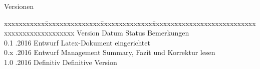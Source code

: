 
\null
\vfill

\begin{Large}
Versionen
\end{Large}

\fontsize{10pt}{18pt}\selectfont
\begin{tabbing}
xxxxxxxxxxx\=xxxxxxxxxxxxxxx\=xxxxxxxxxxxxxx\=xxxxxxxxxxxxxxxxxxxxxxxxxxxxxxxxxxxxxxxxxxxxxxx \kill
Version	\> Datum	\> Status		\> Bemerkungen		\\
0.1	.2016	\> Entwurf		\> Latex-Dokument eingerichtet	\\
0.x	.2016	\> Entwurf		\> Management Summary, Fazit und Korrektur lesen	\\
1.0	.2016	\> Definitiv	\> Definitive Version	\\


\end{tabbing}

